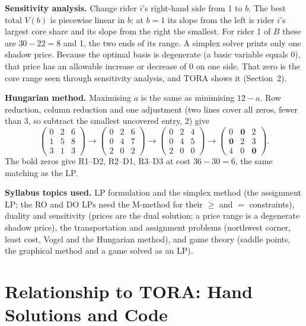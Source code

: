 \documentclass[11pt,a4paper]{article}
\begin{document}
\textbf{Sensitivity analysis.} Change rider $i$'s right-hand side from 1 to $b$. The best total $V(b)$ is piecewise linear in $b$; at $b=1$ its slope from the left is rider $i$'s largest core share and its slope from the right the smallest. For rider 1 of $B$ these are $30-22=8$ and 1, the two ends of its range. A simplex solver prints only one shadow price. Because the optimal basis is degenerate (a basic variable equals 0), that price has an allowable increase or decrease of 0 on one side. That zero is the core range seen through sensitivity analysis, and TORA shows it (Section~2).

\textbf{Hungarian method.} Maximising $a$ is the same as minimising $12-a$. Row reduction, column reduction and one adjustment (two lines cover all zeros, fewer than 3, so subtract the smallest uncovered entry, 2) give
\[
\begin{pmatrix}0&2&6\\1&5&8\\3&1&3\end{pmatrix}\!\to\!
\begin{pmatrix}0&2&6\\0&4&7\\2&0&2\end{pmatrix}\!\to\!
\begin{pmatrix}0&2&4\\0&4&5\\2&0&0\end{pmatrix}\!\to\!
\begin{pmatrix}0&\mathbf{0}&2\\\mathbf{0}&2&3\\4&0&\mathbf{0}\end{pmatrix}.
\]
The bold zeros give R1--D2, R2--D1, R3--D3 at cost $36-30=6$, the same matching as the LP.

\textbf{Syllabus topics used.} LP formulation and the simplex method (the assignment LP; the RO and DO LPs need the M-method for their $\ge$ and $=$ constraints), duality and sensitivity (prices are the dual solution; a price range is a degenerate shadow price), the transportation and assignment problems (northwest corner, least cost, Vogel and the Hungarian method), and game theory (saddle points, the graphical method and a game solved as an LP).

\section{Relationship to TORA: Hand Solutions and Code}
\end{document}

